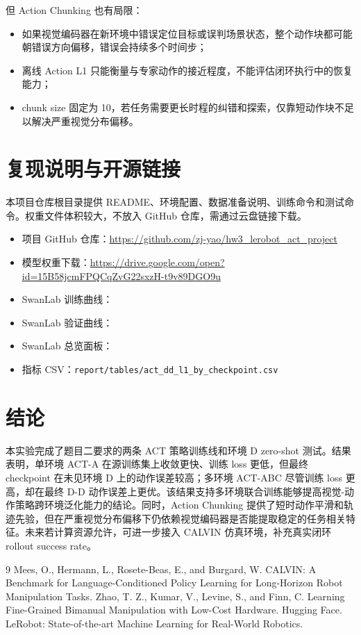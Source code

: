 \documentclass[11pt,a4paper]{ctexart}
\newcommand{\githuburl}{\href{https://github.com/zj-yao/hw3_lerobot_act_project}{https://github.com/zj-yao/hw3\_lerobot\_act\_project}}
\newcommand{\weightsurl}{\href{https://drive.google.com/open?id=15B58jcmFPQCqZvG22sxzH-t9v89DGO9u}{https://drive.google.com/open?id=15B58jcmFPQCqZvG22sxzH-t9v89DGO9u}}
\begin{document}
但 Action Chunking 也有局限：
\begin{itemize}
  \item 如果视觉编码器在新环境中错误定位目标或误判场景状态，整个动作块都可能朝错误方向偏移，错误会持续多个时间步；
  \item 离线 Action L1 只能衡量与专家动作的接近程度，不能评估闭环执行中的恢复能力；
  \item chunk size 固定为 10，若任务需要更长时程的纠错和探索，仅靠短动作块不足以解决严重视觉分布偏移。
\end{itemize}

\section{复现说明与开源链接}
本项目仓库根目录提供 README、环境配置、数据准备说明、训练命令和测试命令。权重文件体积较大，不放入 GitHub 仓库，需通过云盘链接下载。

\begin{itemize}
  \item 项目 GitHub 仓库：\githuburl
  \item 模型权重下载：\weightsurl
  \item SwanLab 训练曲线：
  \item SwanLab 验证曲线：
  \item SwanLab 总览面板：
  \item 指标 CSV：\texttt{report/tables/act\_dd\_l1\_by\_checkpoint.csv}
\end{itemize}

\section{结论}
本实验完成了题目二要求的两条 ACT 策略训练线和环境 D zero-shot 测试。结果表明，单环境 ACT-A 在源训练集上收敛更快、训练 loss 更低，但最终 checkpoint 在未见环境 D 上的动作误差较高；多环境 ACT-ABC 尽管训练 loss 更高，却在最终 D-D 动作误差上更优。该结果支持多环境联合训练能够提高视觉-动作策略跨环境泛化能力的结论。同时，Action Chunking 提供了短时动作平滑和轨迹先验，但在严重视觉分布偏移下仍依赖视觉编码器是否能提取稳定的任务相关特征。未来若计算资源允许，可进一步接入 CALVIN 仿真环境，补充真实闭环 rollout success rate。

\begin{thebibliography}{9}
Mees, O., Hermann, L., Rosete-Beas, E., and Burgard, W. CALVIN: A Benchmark for Language-Conditioned Policy Learning for Long-Horizon Robot Manipulation Tasks.
Zhao, T. Z., Kumar, V., Levine, S., and Finn, C. Learning Fine-Grained Bimanual Manipulation with Low-Cost Hardware.
Hugging Face. LeRobot: State-of-the-art Machine Learning for Real-World Robotics.
\end{thebibliography}
\end{document}

